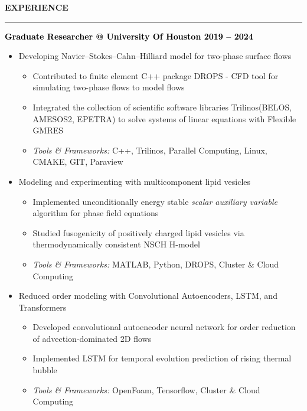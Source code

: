 \documentclass[10pt,letterpaper]{letter}
\newcommand{\gsect}[1]{\textcolor{codepurple}{\textbf{{\Large \uppercase{#1} }}} \\ \hrule}
\newcommand{\gsubsect}[1]{\textcolor{black}{\textbf{{\large #1 }}} }
\begin{document}
\gsect{Experience}

\gsubsect{Graduate Researcher @ University Of Houston \hfill 2019 -- 2024}

\begin{itemize}
	\item {Developing Navier–Stokes–Cahn–Hilliard model for two-phase surface flows}
	\begin{itemize}
	\item {Contributed to finite element C++ package DROPS - CFD tool for simulating two-phase flows  to model flows}
	\item {Integrated the collection of scientific software libraries Trilinos(BELOS, AMESOS2, EPETRA) to solve systems of linear equations with Flexible GMRES}
			\item { \textsl{Tools \& Frameworks:} C++, Trilinos, Parallel Computing, Linux, CMAKE, GIT, Paraview}
	\end{itemize}
\end{itemize}
\begin{itemize}
	\item {Modeling and experimenting with multicomponent lipid vesicles}
	\begin{itemize}
		\item {Implemented unconditionally energy stable \textsl{scalar auxiliary variable} algorithm for phase field equations }
		\item {Studied fusogenicity of positively charged lipid vesicles via thermodynamically consistent NSCH H-model}
		\item {\textsl{Tools \& Frameworks:} MATLAB, Python, DROPS, Cluster \& Cloud Computing}
	\end{itemize}
\end{itemize}
\begin{itemize}
	\item {Reduced order modeling with Convolutional Autoencoders, LSTM, and Transformers}
	\begin{itemize}
		\item {Developed convolutional autoencoder neural network for order reduction of advection-dominated 2D flows}
		\item {Implemented LSTM for temporal evolution prediction of rising thermal bubble }
		\item {\textsl{Tools \& Frameworks:} OpenFoam, Tensorflow, Cluster \& Cloud Computing}
	\end{itemize}
\end{itemize}

%
%
%
%
%
\end{document}
